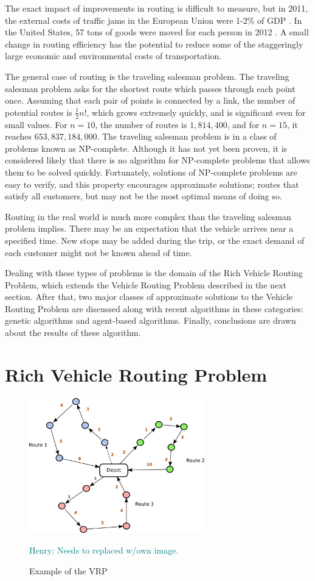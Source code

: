 \documentclass{sig-alternate}
\newcommand{\allcomments}[1]{{#1}}
\newcommand{\hfcomment}[1]{\textcolor{Teal}{\allcomments{Henry: {#1}}}}
\begin{document}
The exact impact of improvements in routing is difficult to measure, but in 2011, the external costs of traffic jams in the European Union were 1-2\% of GDP \cite{Caceres-Cruz:2014}. In the United States, 57 tons of goods were moved for each person in 2012 \cite{BOTS:2012}. A small change in routing efficiency has the potential to reduce some of the staggeringly large economic and environmental costs of transportation.

The general case of routing is the traveling salesman problem. The traveling salesman problem asks for the shortest route which passes through each point once. Assuming that each pair of points is connected by a link, the number of potential routes is $\tfrac{1}{2}n!$, which grows extremely quickly, and is significant even for small values. For $n=10$, the number of routes is $1,814,400$, and for $n=15$, it reaches $653,837,184,000$. The traveling salesman problem is in a class of problems known as NP-complete. Although it has not yet been proven, it is considered likely that there is no algorithm for NP-complete problems that allows them to be solved quickly. Fortunately, solutions of NP-complete problems are easy to verify, and this property encourages approximate solutions; routes that satisfy all customers, but may not be the most optimal means of doing so. 

Routing in the real world is much more complex than the traveling salesman problem implies. There may be an expectation that the vehicle arrives near a specified time. New stops may be added during the trip, or the exact demand of each customer might not be known ahead of time.

Dealing with these types of problems is the domain of the Rich Vehicle Routing Problem, which extends the Vehicle Routing Problem described in the next section. After that, two major classes of approximate solutions to the Vehicle Routing Problem are discussed along with recent algorithms in these categories: genetic algorithms and agent-based algorithms. Finally, conclusions are drawn about the results of these algorithm.

\section{Rich Vehicle Routing Problem}
\label{sec:VRP}

\begin{figure}
\centering
\includegraphics[width=3in, keepaspectratio]{vrp1.png}
\caption{Example of the VRP}
\hfcomment{Needs to replaced w/own image.}
\label{fig:VRPgraph}
\end{figure}
\end{document}
